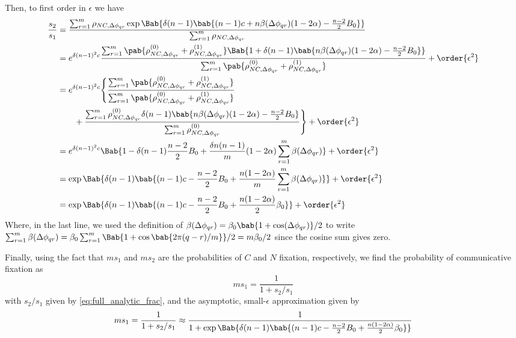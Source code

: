 Then, to first order in $\epsilon$
we have
\begin{align*}
  \frac{s_2}{s_1}
  &=
  \frac
  {\sum_{r=1}^{m} \rho_{NC,\Delta \phi_{qr}}
    \exp \Bab{
      \delta (n-1)
      \bab{
        (n-1) c + n \beta(\Delta \phi_{qr}) (1 - 2 \alpha)
        - \frac{n-2}{2} B_0
      }
    }
  }
  {\sum_{r=1}^{m} \rho_{NC,\Delta \phi_{qr}}}
  \\
  &=
  e^{\delta (n-1)^2 c}
  \frac
  {\sum_{r=1}^{m}
    \pab{
      \rho_{NC,\Delta \phi_{qr}}^{(0)}
      +
      \rho_{NC,\Delta \phi_{qr}}^{(1)}
    }
    \Bab{1 +
      \delta (n-1)
      \bab{
        n \beta(\Delta \phi_{qr}) (1 - 2 \alpha)
        - \frac{n-2}{2} B_0
      }
    }
  }
  {\sum_{r=1}^{m} \pab{
    \rho_{NC,\Delta \phi_{qr}}^{(0)}
    +
    \rho_{NC,\Delta \phi_{qr}}^{(1)}
  }}
  + \order{\epsilon^2}
  \\
  &=
  e^{\delta (n-1)^2 c}
  \Biggl\{
  \frac
  {\sum_{r=1}^{m}
    \pab{
      \rho_{NC,\Delta \phi_{qr}}^{(0)}
      +
      \rho_{NC,\Delta \phi_{qr}}^{(1)}
    }
  }
  {\sum_{r=1}^{m} \pab{
    \rho_{NC,\Delta \phi_{qr}}^{(0)}
    +
    \rho_{NC,\Delta \phi_{qr}}^{(1)}
  }}
  \\
  &\qquad
  +
  \frac
  {\sum_{r=1}^{m} \rho_{NC,\Delta \phi_{qr}}^{(0)}
    \delta (n-1)
    \bab{
      n \beta(\Delta \phi_{qr}) (1 - 2 \alpha)
      - \frac{n-2}{2} B_0
    }
  }
  {\sum_{r=1}^{m} \rho_{NC,\Delta \phi_{qr}}^{(0)}
  }
  \Biggr\}
  + \order{\epsilon^2}
  \\
  &=
  e^{\delta (n-1)^2 c}
  \Bab{
    1
    - \delta (n-1) \frac{n-2}{2} B_0
    +
    \frac{\delta n (n-1)}{m} (1 - 2 \alpha)
    \sum_{r=1}^{m} \beta(\Delta \phi_{qr})
  }
  + \order{\epsilon^2}
  \\
  &=
  \exp \Bab{\delta (n-1) \bab{
    (n-1) c
    - \frac{n-2}{2} B_0
    +
    \frac{n (1 - 2 \alpha)}{m}
    \sum_{r=1}^{m} \beta(\Delta \phi_{qr})
  }}
  + \order{\epsilon^2}
  \\
  &=
  \exp \Bab{ \delta (n-1) \bab{
    (n-1) c
    - \frac{n-2}{2} B_0
    +
    \frac{n (1 - 2 \alpha)}{2} \beta_0
  }}
  + \order{\epsilon^2}
\end{align*}
Where, in the last line, we used
the definition of
$\beta(\Delta \phi_{qr}) = \beta_0 \bab{1 + \cos(\Delta \phi_{qr})}/2$
to write
$\sum_{r=1}^m \beta(\Delta \phi_{qr})
= \beta_0 \sum_{r=1}^m \Bab{1 + \cos\bab{2 \pi (q-r)/m}}/2
= m \beta_0/2$
since the cosine sum gives zero.

Finally, using the fact that $m s_1$ and $m s_2$
are the probabilities of $C$ and $N$ fixation, respectively,
we find the probability of communicative fixation as
\begin{equation}
  m s_1 = \frac{1}{1 + s_2/s_1}
  \label{eq:full_analytic}
\end{equation}
with $s_2/s_1$ given by \cref{eq:full_analytic_frac},
and the asymptotic, small-$\epsilon$ approximation given by
\begin{equation}
  m s_1 = \frac{1}{1 + s_2/s_1}
  \approx
  \frac{1}
  {1 + \exp \Bab{\delta (n-1) \bab{
    (n-1) c
    - \frac{n-2}{2} B_0
    +
    \frac{n (1 - 2 \alpha)}{2} \beta_0
    }}
  }
  \label{eq:analytic_first_term}
\end{equation}

